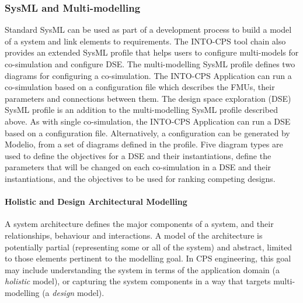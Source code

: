 
\subsubsection{SysML and Multi-modelling}
\label{sec:method:sysml}

Standard SysML can be used as part of a development process to build a model of a system and link elements to requirements. The INTO-CPS tool chain also provides an extended SysML profile that helps users to configure multi-models for co-simulation and configure DSE. The multi-modelling SysML profile defines two diagrams for configuring a co-simulation. The INTO-CPS Application can run a co-simulation based on a configuration file which describes the FMUs, their parameters and connections between them. The design space exploration (DSE) SysML profile is an addition to the multi-modelling SysML profile described above. As with single co-simulation, the INTO-CPS Application can run a DSE based on a configuration file. Alternatively, a configuration can be generated by Modelio, from a set of diagrams defined in the profile. Five diagram types are used to define the objectives for a DSE and their instantiations, define the parameters that will be changed on each co-simulation in a DSE and their instantiations, and the objectives to be used for ranking competing designs.

\paragraph{Holistic and Design Architectural Modelling}
\label{sec:sysml:holistic}

A system architecture defines the major components of a system, and their relationships, behaviour and interactions. A model of the architecture is potentially partial (representing some or all of the system) and abstract, limited to those elements pertinent to the modelling goal. In CPS engineering, this goal may include understanding the system in terms of the application domain (a \emph{holistic} model), or capturing the system components in a way that targets multi-modelling (a \emph{design} model).


